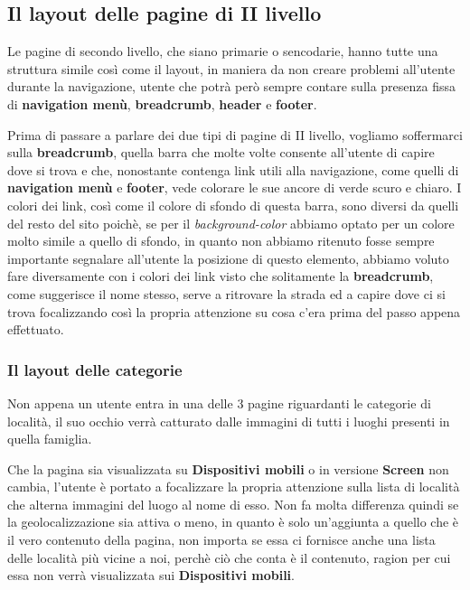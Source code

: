 \subsection{Il layout delle pagine di II livello}\label{sec:Pres-IIliv}
Le pagine di secondo livello, che siano primarie o sencodarie, hanno tutte una
struttura simile così come il layout, in maniera da non creare problemi
all'utente durante la navigazione, utente che potrà però sempre contare sulla
presenza fissa di \textbf{navigation menù}, \textbf{breadcrumb},
\textbf{header} e \textbf{footer}.

Prima di passare a parlare dei due tipi di pagine di II livello, vogliamo
soffermarci sulla \textbf{breadcrumb}, quella barra che molte volte consente
all'utente di capire dove si trova e che, nonostante contenga link utili alla
navigazione, come quelli di \textbf{navigation menù} e \textbf{footer}, vede
colorare le sue ancore di verde scuro e chiaro. I colori dei link, così come
il colore di sfondo di questa barra, sono diversi da quelli del resto del sito
poichè, se per il \textit{background-color} abbiamo optato per un colore molto
simile a quello di sfondo, in quanto non abbiamo ritenuto fosse sempre
importante segnalare all'utente la posizione di questo elemento, abbiamo
voluto fare diversamente con i colori dei link visto che solitamente la
\textbf{breadcrumb}, come suggerisce il nome stesso, serve a ritrovare la
strada ed a capire dove ci si trova focalizzando così la propria attenzione su
cosa c'era prima del passo appena effettuato.

\subsubsection{Il layout delle categorie}\label{sec:Pres-IIliv-cat}
Non appena un utente entra in una delle 3 pagine riguardanti le categorie di
località, il suo occhio verrà catturato dalle immagini di tutti i luoghi
presenti in quella famiglia.

Che la pagina sia visualizzata su \textbf{Dispositivi mobili} o in versione
\textbf{Screen} non cambia, l'utente è portato a focalizzare la propria
attenzione sulla lista di località che alterna immagini del luogo al nome di
esso. Non fa molta differenza quindi se la geolocalizzazione sia attiva o
meno, in quanto è solo un'aggiunta a quello che è il vero contenuto della
pagina, non importa se essa ci fornisce anche una lista delle località più
vicine a noi, perchè ciò che conta è il contenuto, ragion per cui essa non
verrà visualizzata sui \textbf{Dispositivi mobili}.

